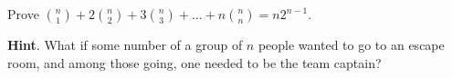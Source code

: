\documentclass{book}
\begin{document}
\setcounter{cpjt}{98}
\addtocounter{cpjt}{-1}
\begin{activity}\label{act_anysizecommittee}
\hypertarget{p-694}{}%
Prove \(\binom{n}{1} + 2 \binom{n}{2} + 3 \binom{n}{3} + \ldots + n \binom{n}{n} = n2^{n - 1}\).%
\par\smallskip%
\noindent\textbf{Hint}.\hypertarget{hint-52}{}\quad%
\hypertarget{p-695}{}%
What if some number of a group of \(n\) people wanted to go to an escape room, and among those going, one needed to be the team captain?%
\par\smallskip%
\noindent\end{activity}

\clearpage
\end{document}
